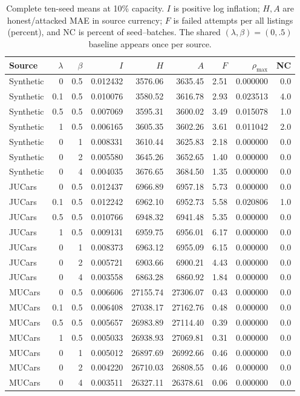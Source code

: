 \documentclass[11pt]{article}
\begin{document}
\begin{table}[htbp]\centering\small
\setlength{\tabcolsep}{4pt}
\caption{Complete ten-seed means at 10\% capacity. $I$ is positive log inflation;
$H,A$ are honest/attacked MAE in source currency; $F$ is failed attempts per
all listings (percent), and NC is percent of seed--batches. The shared
$(\lambda,\beta)=(0,.5)$ baseline appears once per source.}
\label{tab:gap_all}
\begin{tabular}{lrrrrrrrr}\toprule
Source & $\lambda$ & $\beta$ & $I$ & $H$ & $A$ & $F$ & $\rho_{\max}$ & NC\\\midrule
Synthetic & 0 & 0.5 & 0.012432 & 3576.06 & 3635.45 & 2.51 & 0.000000 & 0.0\\
Synthetic & 0.1 & 0.5 & 0.010076 & 3580.52 & 3616.78 & 2.93 & 0.023513 & 4.0\\
Synthetic & 0.5 & 0.5 & 0.007069 & 3595.31 & 3600.02 & 3.49 & 0.015078 & 1.0\\
Synthetic & 1 & 0.5 & 0.006165 & 3605.35 & 3602.26 & 3.61 & 0.011042 & 2.0\\
Synthetic & 0 & 1 & 0.008331 & 3610.44 & 3625.83 & 2.18 & 0.000000 & 0.0\\
Synthetic & 0 & 2 & 0.005580 & 3645.26 & 3652.65 & 1.40 & 0.000000 & 0.0\\
Synthetic & 0 & 4 & 0.004035 & 3676.65 & 3684.50 & 1.35 & 0.000000 & 0.0\\
\midrule
JUCars & 0 & 0.5 & 0.012437 & 6966.89 & 6957.18 & 5.73 & 0.000000 & 0.0\\
JUCars & 0.1 & 0.5 & 0.012242 & 6962.10 & 6952.73 & 5.58 & 0.020806 & 1.0\\
JUCars & 0.5 & 0.5 & 0.010766 & 6948.32 & 6941.48 & 5.35 & 0.000000 & 0.0\\
JUCars & 1 & 0.5 & 0.009131 & 6959.75 & 6956.01 & 6.17 & 0.000000 & 0.0\\
JUCars & 0 & 1 & 0.008373 & 6963.12 & 6955.09 & 6.15 & 0.000000 & 0.0\\
JUCars & 0 & 2 & 0.005721 & 6903.66 & 6900.21 & 4.43 & 0.000000 & 0.0\\
JUCars & 0 & 4 & 0.003558 & 6863.28 & 6860.92 & 1.84 & 0.000000 & 0.0\\
\midrule
MUCars & 0 & 0.5 & 0.006606 & 27155.74 & 27306.07 & 0.43 & 0.000000 & 0.0\\
MUCars & 0.1 & 0.5 & 0.006408 & 27038.17 & 27162.76 & 0.48 & 0.000000 & 0.0\\
MUCars & 0.5 & 0.5 & 0.005657 & 26983.89 & 27114.40 & 0.39 & 0.000000 & 0.0\\
MUCars & 1 & 0.5 & 0.005033 & 26938.93 & 27069.81 & 0.31 & 0.000000 & 0.0\\
MUCars & 0 & 1 & 0.005012 & 26897.69 & 26992.66 & 0.46 & 0.000000 & 0.0\\
MUCars & 0 & 2 & 0.004220 & 26710.03 & 26808.55 & 0.46 & 0.000000 & 0.0\\
MUCars & 0 & 4 & 0.003511 & 26327.11 & 26378.61 & 0.06 & 0.000000 & 0.0\\
\bottomrule\end{tabular}\end{table}
\end{document}
